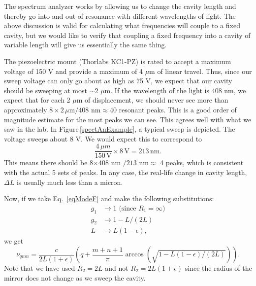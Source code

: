 The spectrum analyzer works by allowing us to change the cavity length and thereby go into and out of resonance with different wavelengths of light. The above discussion is valid for calculating what frequencies will couple to a fixed cavity, but we would like to verify that coupling a fixed frequency into a cavity of variable length will give us essentially the same thing.


The piezoelectric mount (Thorlabs KC1-PZ) is rated to accept a maximum voltage of 150 V and provide a maximum of 4 $\mu$m of linear travel. Thus, since our sweep voltage can only go about as high as 75 V, we expect that our cavity should be sweeping at most $\sim$2 $\mu$m. If the wavelength of the light is 408 nm, we expect that for each 2 $\mu$m of displacement, we should never see more than approximately $8\times2\,\mu$m$/408$ nm$\approx 40$ resonant peaks. This is a good order of magnitude estimate for the most peaks we can see. This agrees well with what we saw in the lab. In Figure\,\ref{spectAnExample}, a typical sweep is depicted. The voltage sweeps about 8 V. We would expect this to correspond to 
\begin{equation}
\frac{4\,\mu m}{150\,\mathrm{V}}\times 8\,\mathrm{V} = 213\,\mathrm{nm}.
\end{equation}
This means there should be 8$\times 408$ nm $/213$ nm$\approx$ 4 peaks, which is consistent with the actual 5 sets of peaks.
In any case, the real-life change in cavity length, $\Delta L$ is usually much less than a micron.

Now, if we take Eq.\ \ref{eqModeF} and make the following substitutions:
\begin{align}
g_1&\rightarrow1 \text{ (since $R_1=\infty$)} \\
g_2&\rightarrow 1-L/(2L)\\
L&\rightarrow L(1-\epsilon),
\end{align}
we get 
\begin{equation} \label{eqModeF_ready_for_expansion}
\nu_{qmn}=\frac{c}{2L(1+\epsilon)}\left(q+\frac{m+n+1}{\pi}\arccos(\sqrt{1-L(1-\epsilon)/(2L)})\right).
\end{equation}
Note that we have used $R_2=2L$ and not $R_2=2L(1+\epsilon)$ since the radius of the mirror does not change as we sweep the cavity. 

